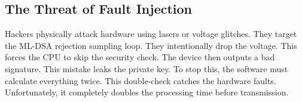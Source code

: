 \subsection{The Threat of Fault Injection}
Hackers physically attack hardware using lasers or voltage glitches. They target the ML-DSA rejection sampling loop. They intentionally drop the voltage. This forces the CPU to skip the security check. The device then outputs a bad signature. This mistake leaks the private key. To stop this, the software must calculate everything twice. This double-check catches the hardware faults. Unfortunately, it completely doubles the processing time before transmission.
